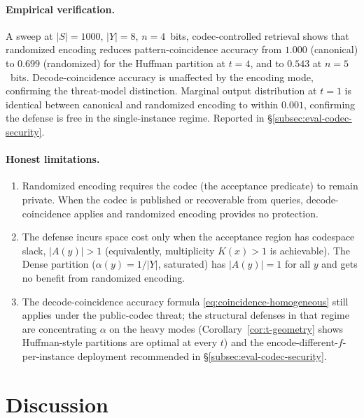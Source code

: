 \documentclass[11pt]{article}
\theoremstyle{definition}
\theoremstyle{plain}
\theoremstyle{remark}
\begin{document}
\paragraph{Empirical verification.}
A sweep at $|S| = 1000$, $|Y| = 8$, $n = 4$~bits, codec-controlled
retrieval shows that randomized encoding reduces pattern-coincidence
accuracy from $1.000$ (canonical) to $0.699$ (randomized) for the
Huffman partition at $t = 4$, and to $0.543$ at $n = 5$~bits.
Decode-coincidence accuracy is unaffected by the encoding mode,
confirming the threat-model distinction.  Marginal output distribution
at $t = 1$ is identical between canonical and randomized encoding to
within $0.001$, confirming the defense is free in the single-instance
regime.  Reported in \S\ref{subsec:eval-codec-security}.

\paragraph{Honest limitations.}
\begin{enumerate}
\item Randomized encoding requires the codec (the acceptance
    predicate) to remain private.  When the codec is published or
    recoverable from queries, decode-coincidence applies and
    randomized encoding provides no protection.
\item The defense incurs space cost only when the acceptance region
    has codespace slack, $|A(y)| > 1$ (equivalently, multiplicity
    $K(x) > 1$ is achievable).  The Dense partition
    ($\alpha(y) = 1/|Y|$, saturated) has $|A(y)| = 1$ for all $y$ and
    gets no benefit from randomized encoding.
\item The decode-coincidence accuracy formula
    \eqref{eq:coincidence-homogeneous} still applies under the
    public-codec threat; the structural defenses in that regime are
    concentrating $\alpha$ on the heavy modes
    (Corollary~\ref{cor:t-geometry} shows Huffman-style partitions
    are optimal at every $t$) and the encode-different-$f$-per-instance
    deployment recommended in \S\ref{subsec:eval-codec-security}.
\end{enumerate}


\section{Discussion}
\label{sec:discussion}
\end{document}
